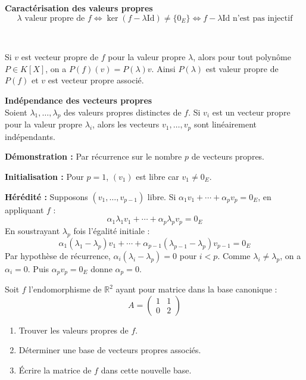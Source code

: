\documentclass[../PolyS4.tex]{subfiles}
\begin{document}
\begin{Prop}\textbf{Caractérisation des valeurs propres}\\

$$\lambda \text{ valeur propre de } f \Longleftrightarrow \ker(f - \lambda \mathrm{Id}) \neq \{0_E\} \Longleftrightarrow f - \lambda \mathrm{Id} \text{ n'est pas injectif}$$
\end{Prop}

\begin{Rmq}$\,$

Si $v$ est vecteur propre de $f$ pour la valeur propre $\lambda$, alors pour tout polynôme $P \in K[X]$, on a $P(f)(v) = P(\lambda) v$. Ainsi $P(\lambda)$ est valeur propre de $P(f)$ et $v$ est vecteur propre associé.
\end{Rmq}

\begin{Thm}\textbf{Indépendance des vecteurs propres}\\

Soient $\lambda_1, \ldots, \lambda_p$ des valeurs propres distinctes de $f$. Si $v_i$ est un vecteur propre pour la valeur propre $\lambda_i$, alors les vecteurs $v_1, \ldots, v_p$ sont linéairement indépendants.
\end{Thm}

\begin{Rmq}
\textbf{Démonstration :}
Par récurrence sur le nombre $p$ de vecteurs propres.

\textbf{Initialisation :} Pour $p = 1$, $(v_1)$ est libre car $v_1 \neq 0_E$.

\textbf{Hérédité :} Supposons $(v_1, \ldots, v_{p-1})$ libre. Si $\alpha_1 v_1 + \cdots + \alpha_p v_p = 0_E$, en appliquant $f$ :
$$\alpha_1 \lambda_1 v_1 + \cdots + \alpha_p \lambda_p v_p = 0_E$$
En soustrayant $\lambda_p$ fois l'égalité initiale :
$$\alpha_1 (\lambda_1 - \lambda_p) v_1 + \cdots + \alpha_{p-1} (\lambda_{p-1} - \lambda_p) v_{p-1} = 0_E$$
Par hypothèse de récurrence, $\alpha_i (\lambda_i - \lambda_p) = 0$ pour $i < p$. Comme $\lambda_i \neq \lambda_p$, on a $\alpha_i = 0$. Puis $\alpha_p v_p = 0_E$ donne $\alpha_p = 0$.
\end{Rmq}


\newpage


Soit $f$ l'endomorphisme de $\mathbb{R}^2$ ayant pour matrice dans la base canonique :
$$A = \begin{pmatrix}
1 & 1 \\
0 & 2
\end{pmatrix}$$
\begin{enumerate}
    \item Trouver les valeurs propres de $f$.
    \item Déterminer une base de vecteurs propres associés.
    \item Écrire la matrice de $f$ dans cette nouvelle base.
\end{enumerate}
\end{document}
